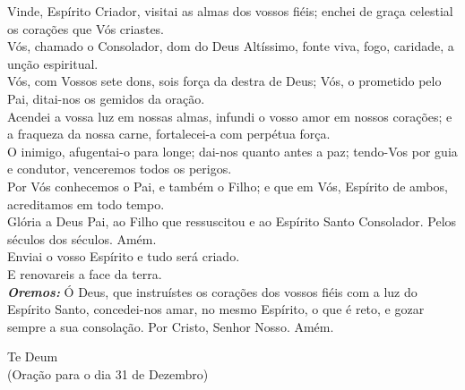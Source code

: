 \documentclass{book}
\begin{document}
\begin{flushleft}
    Vinde, Espírito Criador, visitai as almas dos vossos fiéis; enchei de graça celestial os corações que Vós criastes.
    \vspace{.2cm} \\
    Vós, chamado o Consolador, dom do Deus Altíssimo, fonte viva, fogo, caridade, a unção espiritual.
    \vspace{.2cm} \\
    Vós, com Vossos sete dons, sois força da destra de Deus; Vós, o prometido pelo Pai, ditai-nos os gemidos da oração.
    \vspace{.2cm} \\
    Acendei a vossa luz em nossas almas, infundi o vosso amor em nossos corações; e a fraqueza da nossa carne, fortalecei-a com perpétua força.
    \vspace{.2cm} \\
    O inimigo, afugentai-o para longe; dai-nos quanto antes a paz; tendo-Vos por guia e condutor, venceremos todos os perigos.
    \vspace{.2cm} \\
    Por Vós conhecemos o Pai, e também o Filho; e que em Vós, Espírito de ambos, acreditamos em todo tempo.
    \vspace{.2cm} \\
    Glória a Deus Pai, ao Filho que ressuscitou e ao Espírito Santo Consolador. Pelos séculos dos séculos. Amém.
    \vspace{.2cm} \\
    \VbarRed{} Enviai o vosso Espírito e tudo será criado. \\
    \RbarRed{} E renovareis a face da terra.
    \vspace{.2cm} \\
    \textbf{\textit{Oremos:}} Ó Deus, que instruístes os corações dos vossos fiéis com a luz do Espírito Santo, concedei-nos amar, no mesmo Espírito, o que é reto, e gozar sempre a sua consolação. Por Cristo, Senhor Nosso. Amém.
\end{flushleft}
\newpage
\begin{center}
    Te Deum \\ \textcolor{VioletRed2}{\scriptsize{(Oração para o dia 31 de Dezembro)}}
\end{center}
\end{document}

